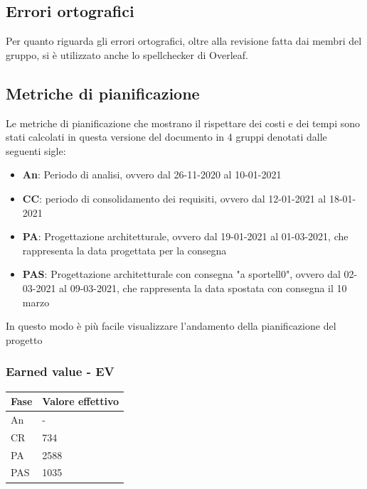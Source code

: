 \subsection{Errori ortografici}

Per quanto riguarda gli errori ortografici, oltre alla revisione fatta dai membri del gruppo, si è utilizzato anche lo spellchecker di Overleaf.
\newpage

\subsection{Metriche di pianificazione}
Le metriche di pianificazione che mostrano il rispettare dei costi e dei tempi sono stati calcolati in questa versione del documento in 4 gruppi denotati dalle seguenti sigle:
\begin{itemize}
    \item \textbf{An}: Periodo di analisi, ovvero dal 26-11-2020 al 10-01-2021
    \item \textbf{CC}: periodo di consolidamento dei requisiti, ovvero dal 12-01-2021 al 18-01-2021
    \item \textbf{PA}: Progettazione architetturale, ovvero dal 19-01-2021 al 01-03-2021, che rappresenta la data progettata per la consegna
    \item \textbf{PAS}: Progettazione architetturale con consegna "a sportell0", ovvero dal 02-03-2021 al 09-03-2021, che rappresenta la data spostata con consegna il 10 marzo
\end{itemize}
In questo modo è più facile visualizzare l'andamento della pianificazione del progetto

\subsubsection{Earned value - EV}

\begin{longtabu} to \textwidth {| X[0.1,c m] | X[0.1,c m] |}
    \hline
    \textbf{Fase} &
    \textbf{Valore effettivo} \\
    \hline
    An & -  \\ 
    \hline
    CR & 734 \\
    \hline
    PA & 2588 \\
    \hline
    PAS & 1035 \\
    \hline 
    \end{longtabu}

